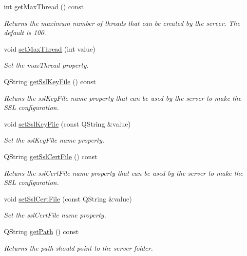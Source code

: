 \begin{DoxyCompactItemize}
int \hyperlink{class_configuration_ad0e836129d0a7e0111b1f2c092729939}{get\+Max\+Thread} () const
\begin{DoxyCompactList}\small\item\em Returns the maximum number of threads that can be created by the server. The default is 100. \end{DoxyCompactList}\item 
void \hyperlink{class_configuration_ab242af54d85d49b88b778a50a77949a5}{set\+Max\+Thread} (int value)
\begin{DoxyCompactList}\small\item\em Set the max\+Thread property. \end{DoxyCompactList}\item 
Q\+String \hyperlink{class_configuration_a96082bdd3333d8ddf2017a95fe302225}{get\+Ssl\+Key\+File} () const
\begin{DoxyCompactList}\small\item\em Retuns the ssl\+Key\+File name property that can be used by the server to make the S\+SL configuration. \end{DoxyCompactList}\item 
void \hyperlink{class_configuration_a646d1ce1463b0519c745483a228c4949}{set\+Ssl\+Key\+File} (const Q\+String \&value)
\begin{DoxyCompactList}\small\item\em Set the ssl\+Key\+File name property. \end{DoxyCompactList}\item 
Q\+String \hyperlink{class_configuration_a10405dacfb3b61f60b290c0a5d79a8fb}{get\+Ssl\+Cert\+File} () const
\begin{DoxyCompactList}\small\item\em Retuns the ssl\+Cert\+File name property that can be used by the server to make the S\+SL configuration. \end{DoxyCompactList}\item 
void \hyperlink{class_configuration_a16eecdd98ab2b9c4737f3178656bb3ad}{set\+Ssl\+Cert\+File} (const Q\+String \&value)
\begin{DoxyCompactList}\small\item\em Set the ssl\+Cert\+File name property. \end{DoxyCompactList}\item 
Q\+String \hyperlink{class_configuration_a43acf80f787217903281b0a6d3e01e11}{get\+Path} () const
\begin{DoxyCompactList}\small\item\em Returns the path should point to the server folder. \end{DoxyCompactList}\item 

\end{DoxyCompactItemize}
